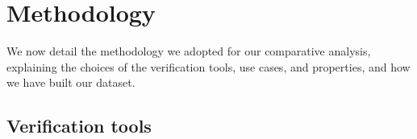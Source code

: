 \section{Methodology}
\label{sec:methodology}



We now detail the methodology we adopted for our comparative analysis,
explaining the choices of the verification tools, use cases, and properties, and how we have built our dataset.%


\subsection{Verification tools}
\label{sec:methodology:provers}

